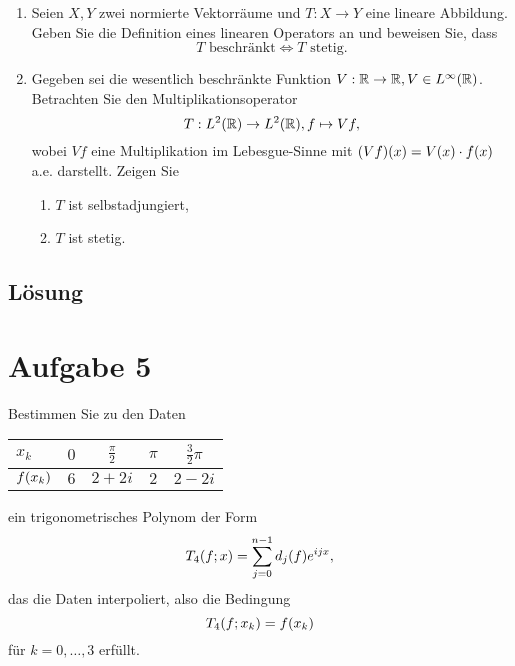 \documentclass{exercise}
\begin{document}
    \begin{problem}
        \begin{enumerate}
            \item Seien \(X, Y\) zwei normierte Vektorräume und \(T: X \to Y\) eine lineare Abbildung.
            Geben Sie die Definition eines linearen Operators an und beweisen Sie, dass
            \[
                T\text{ beschränkt} \iff T\text{ stetig}.
            \]
            \item Gegeben sei die wesentlich beschränkte Funktion \(V: \R \to \R, V \in L^\infty\parentheses*{\R}\).
            Betrachten Sie den Multiplikationsoperator
            \[
                T: L^2\parentheses*{\R} \to L^2\parentheses*{\R}, f \mapsto Vf,
            \]
            wobei \(Vf\) eine Multiplikation im Lebesgue-Sinne mit \(\parentheses*{Vf}\parentheses*{x} = V\parentheses*{x} \cdot f\parentheses*{x}\) a.e. darstellt.
            Zeigen Sie
            \begin{enumerate}
                \item \(T\) ist selbstadjungiert,
                \item \(T\) ist stetig.
            \end{enumerate}
        \end{enumerate}
    \end{problem}
    
    \subsection*{Lösung}


    \section*{Aufgabe 5}
    
    \begin{problem}
        Bestimmen Sie zu den Daten
        \begin{center}
            \begin{tabular}{lcccc}
                \toprule
                \(x_k\) & \(0\) & \(\frac{\pi}{2}\) & \(\pi\) & \(\frac{3}{2}\pi\)\\
                \midrule
                \(f\parentheses*{x_k}\) & \(6\) & \(2 + 2i\) & \(2\) & \(2 - 2i\)\\
            \end{tabular}
        \end{center}
        ein trigonometrisches Polynom der Form
        \[
            T_4\parentheses*{f; x} = \sum_{j = 0}^{n - 1}d_j\parentheses*{f}e^{ijx},
        \]
        das die Daten interpoliert, also die Bedingung
        \[
            T_4\parentheses*{f; x_k} = f\parentheses*{x_k}
        \]
        für \(k = 0, \ldots, 3\) erfüllt.
    \end{problem}
    
\end{document}
